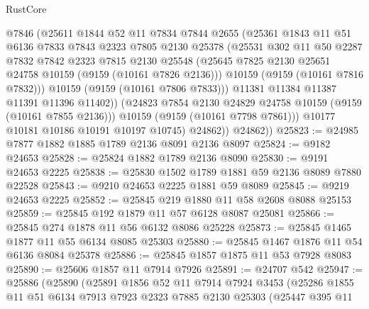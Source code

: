 \begin{lexlean}{RustCore}
\begin{coremodule}
                  @7846
                  (@25611
                    @1844
                    @52
                    @11
                    @7834
                    @7844
                    @2655
                    (@25361
                      @1843
                      @11
                      @51
                      @6136
                      @7833
                      @7843
                      @2323
                      @7805
                      @2130
                      @25378
                      (@25531
                        @302
                        @11
                        @50
                        @2287
                        @7832
                        @7842
                        @2323
                        @7815
                        @2130
                        @25548
                        (@25645 @7825 @2130 @25651 @24758 @10159 (@9159 (@10161 @7826 @2136)))
                        @10159
                        (@9159 (@10161 @7816 @7832)))
                      @10159
                      (@9159 (@10161 @7806 @7833)))
                    @11381
                    @11384
                    @11387
                    @11391
                    @11396
                    @11402))
                (@24823 @7854 @2130 @24829 @24758 @10159 (@9159 (@10161 @7855 @2136)))
                @10159
                (@9159 (@10161 @7798 @7861)))
              @10177
              @10181
              @10186
              @10191
              @10197
              @10745)
            @24862))
        @24862))
@25823 := @24985 @7877 @1882 @1885 @1789 @2136 @8091 @2136 @8097
@25824 := @9182 @24653
@25828 := @25824 @1882 @1789 @2136 @8090
@25830 := @9191 @24653 @2225
@25838 := @25830 @1502 @1789 @1881 @59 @2136 @8089 @7880 @22528
@25843 := @9210 @24653 @2225 @1881 @59 @8089
@25845 := @9219 @24653 @2225
@25852 := @25845 @219 @1880 @11 @58 @2608 @8088 @25153
@25859 := @25845 @192 @1879 @11 @57 @6128 @8087 @25081
@25866 := @25845 @274 @1878 @11 @56 @6132 @8086 @25228
@25873 := @25845 @1465 @1877 @11 @55 @6134 @8085 @25303
@25880 := @25845 @1467 @1876 @11 @54 @6136 @8084 @25378
@25886 := @25845 @1857 @1875 @11 @53 @7928 @8083
@25890 := @25606 @1857 @11 @7914 @7926
@25891 := @24707 @542
@25947 := @25886
    (@25890
      (@25891
        @1856
        @52
        @11
        @7914
        @7924
        @3453
        (@25286
          @1855
          @11
          @51
          @6134
          @7913
          @7923
          @2323
          @7885
          @2130
          @25303
          (@25447
            @395
            @11

\end{coremodule}
\end{lexlean}
